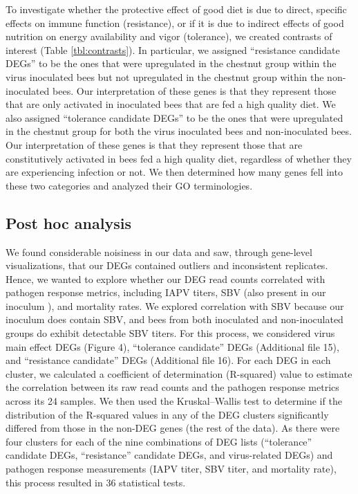 \documentclass{bmcart}
\begin{document}
\begin{linenumbers}
\begin{doublespacing}
To investigate whether the protective effect of good diet is due to direct, specific effects on immune function (resistance), or if it is due to indirect effects of good nutrition on energy availability and vigor (tolerance), we created contrasts of interest (Table \ref{tbl:contrasts}). In particular, we assigned ``resistance candidate DEGs'' to be the ones that were upregulated in the chestnut group within the virus inoculated bees but not upregulated in the chestnut group within the non-inoculated bees. Our interpretation of these genes is that they represent those that are only activated in inoculated bees that are fed a high quality diet. We also assigned ``tolerance candidate DEGs'' to be the ones that were upregulated in the chestnut group for both the virus inoculated bees and non-inoculated bees. Our interpretation of these genes is that they represent those that are constitutively activated in bees fed a high quality diet, regardless of whether they are experiencing infection or not. We then determined how many genes fell into these two categories and analyzed their GO terminologies.

\subsection*{Post hoc analysis}

We found considerable noisiness in our data and saw, through gene-level visualizations, that our DEGs contained outliers and inconsistent replicates. Hence, we wanted to explore whether our DEG read counts correlated with pathogen response metrics, including IAPV titers, SBV (also present in our inoculum \cite{carrillo, adamInt}), and mortality rates. We explored correlation with SBV because our inoculum \cite{carrillo} does contain SBV, and bees from both inoculated and non-inoculated groups do exhibit detectable SBV titers. For this process, we considered virus main effect DEGs (Figure 4), ``tolerance candidate'' DEGs (Additional file 15), and ``resistance candidate'' DEGs (Additional file 16). For each DEG in each cluster, we calculated a coefficient of determination (R-squared) value to estimate the correlation between its raw read counts and the pathogen response metrics across its 24 samples. We then used the Kruskal–Wallis test to determine if the distribution of the R-squared values in any of the DEG clusters significantly differed from those in the non-DEG genes (the rest of the data). As there were four clusters for each of the nine combinations of DEG lists (``tolerance'' candidate DEGs, ``resistance'' candidate DEGs, and virus-related DEGs) and pathogen response measurements (IAPV titer, SBV titer, and mortality rate), this process resulted in 36 statistical tests.


\end{doublespacing}
\end{linenumbers}
\end{document}
